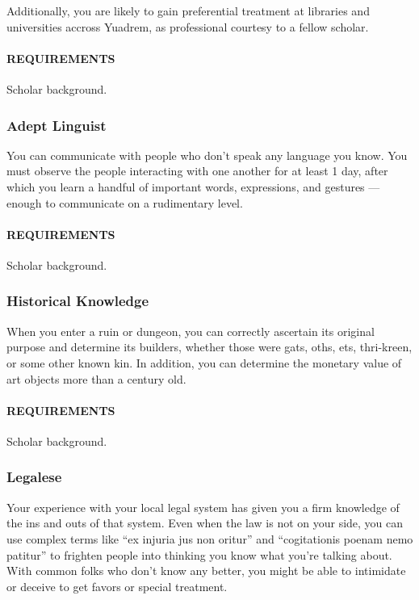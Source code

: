         Additionally, you are likely to gain preferential treatment at libraries and universities accross Yuadrem, as professional courtesy to a fellow scholar.
        \paragraph{REQUIREMENTS} Scholar background.

    \subsubsection{Adept Linguist} \label{feat::adeptlinguist}
        You can communicate with people who don't speak any language you know.
        You must observe the people interacting with one another for at least 1 day, after which you learn a handful of important words, expressions, and gestures --- enough to communicate on a rudimentary level.
    \paragraph{REQUIREMENTS} Scholar background.

    \subsubsection{Historical Knowledge} \label{feat::historicalknowledge}
        When you enter a ruin or dungeon, you can correctly ascertain its original purpose and determine its builders, whether those were gats, oths, ets, thri-kreen, or some other known kin.
        In addition, you can determine the monetary value of art objects more than a century old.
        \paragraph{REQUIREMENTS} Scholar background.

    \subsubsection{Legalese} \label{feat::legalese}
        Your experience with your local legal system has given you a firm knowledge of the ins and outs of that system.
        Even when the law is not on your side, you can use complex terms like ``ex injuria jus non oritur'' and ``cogitationis poenam nemo patitur'' to frighten people into thinking you know what you're talking about.
        With common folks who don't know any better, you might be able to intimidate or deceive to get favors or special treatment.
